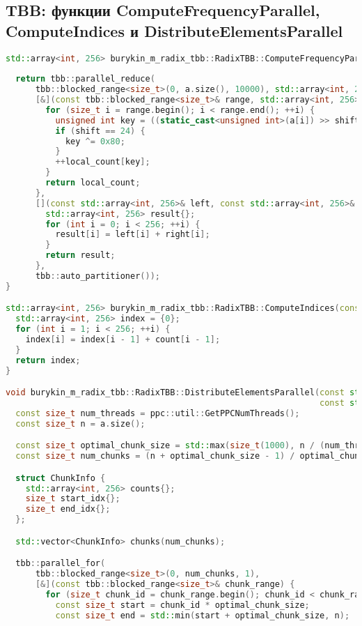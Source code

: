 \documentclass[12pt]{article}
\begin{document}
\subsection*{TBB: функции ComputeFrequencyParallel, ComputeIndices и DistributeElementsParallel}
\begin{lstlisting}[language=C++]
std::array<int, 256> burykin_m_radix_tbb::RadixTBB::ComputeFrequencyParallel(const std::vector<int>& a,
                                                                             const int shift) {
  return tbb::parallel_reduce(
      tbb::blocked_range<size_t>(0, a.size(), 10000), std::array<int, 256>{},
      [&](const tbb::blocked_range<size_t>& range, std::array<int, 256> local_count) {
        for (size_t i = range.begin(); i < range.end(); ++i) {
          unsigned int key = ((static_cast<unsigned int>(a[i]) >> shift) & 0xFFU);
          if (shift == 24) {
            key ^= 0x80;
          }
          ++local_count[key];
        }
        return local_count;
      },
      [](const std::array<int, 256>& left, const std::array<int, 256>& right) {
        std::array<int, 256> result{};
        for (int i = 0; i < 256; ++i) {
          result[i] = left[i] + right[i];
        }
        return result;
      },
      tbb::auto_partitioner());
}

std::array<int, 256> burykin_m_radix_tbb::RadixTBB::ComputeIndices(const std::array<int, 256>& count) {
  std::array<int, 256> index = {0};
  for (int i = 1; i < 256; ++i) {
    index[i] = index[i - 1] + count[i - 1];
  }
  return index;
}

void burykin_m_radix_tbb::RadixTBB::DistributeElementsParallel(const std::vector<int>& a, std::vector<int>& b,
                                                               const std::array<int, 256>& index, const int shift) {
  const size_t num_threads = ppc::util::GetPPCNumThreads();
  const size_t n = a.size();

  const size_t optimal_chunk_size = std::max(size_t(1000), n / (num_threads * 4));
  const size_t num_chunks = (n + optimal_chunk_size - 1) / optimal_chunk_size;

  struct ChunkInfo {
    std::array<int, 256> counts{};
    size_t start_idx{};
    size_t end_idx{};
  };

  std::vector<ChunkInfo> chunks(num_chunks);

  tbb::parallel_for(
      tbb::blocked_range<size_t>(0, num_chunks, 1),
      [&](const tbb::blocked_range<size_t>& chunk_range) {
        for (size_t chunk_id = chunk_range.begin(); chunk_id < chunk_range.end(); ++chunk_id) {
          const size_t start = chunk_id * optimal_chunk_size;
          const size_t end = std::min(start + optimal_chunk_size, n);


\end{lstlisting}
\end{document}
